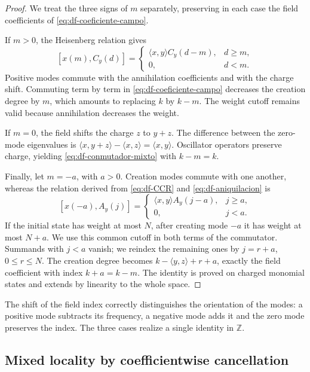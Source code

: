 \begin{proof}
We treat the three signs of \(m\) separately, preserving in each case the field coefficients of \eqref{eq:df-coeficiente-campo}.

If \(m>0\), the Heisenberg relation gives
\[
 [x(m),C_y(d)]=
 \begin{cases}
 \langle x,y\rangle C_y(d-m),&d\geq m,\\
 0,&d<m.
 \end{cases}
\]
Positive modes commute with the annihilation coefficients and with the charge shift. Commuting term by term in \eqref{eq:df-coeficiente-campo} decreases the creation degree by \(m\), which amounts to replacing \(k\) by \(k-m\). The weight cutoff remains valid because annihilation decreases the weight.

If \(m=0\), the field shifts the charge \(z\) to \(y+z\). The difference between the zero-mode eigenvalues is \(\langle x,y+z\rangle-\langle x,z\rangle=\langle x,y\rangle\). Oscillator operators preserve charge, yielding \eqref{eq:df-conmutador-mixto} with \(k-m=k\).

Finally, let \(m=-a\), with \(a>0\). Creation modes commute with one another, whereas the relation derived from \eqref{eq:df-CCR} and \eqref{eq:df-aniquilacion} is
\[
 [x(-a),A_y(j)]=
 \begin{cases}
 \langle x,y\rangle A_y(j-a),&j\geq a,\\
 0,&j<a.
 \end{cases}
\]
If the initial state has weight at most \(N\), after creating mode \(-a\) it has weight at most \(N+a\). We use this common cutoff in both terms of the commutator. Summands with \(j<a\) vanish; we reindex the remaining ones by \(j=r+a\), \(0\leq r\leq N\). The creation degree becomes \(k-\langle y,z\rangle+r+a\), exactly the field coefficient with index \(k+a=k-m\). The identity is proved on charged monomial states and extends by linearity to the whole space.
\end{proof}

The shift of the field index correctly distinguishes the orientation of the modes: a positive mode subtracts its frequency, a negative mode adds it and the zero mode preserves the index. The three cases realize a single identity in \(\mathbb Z\).

\subsection{Mixed locality by coefficientwise cancellation}
\label{subsec:df-localidad-mixta}


